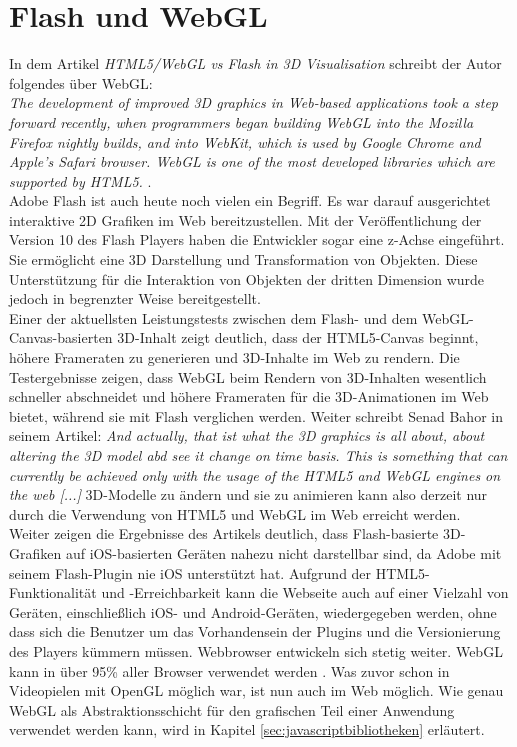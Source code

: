 \section{Flash und WebGL}
\label{sec:webgl2}
%
In dem Artikel \emph{HTML5/WebGL vs Flash in 3D Visualisation} schreibt der Autor folgendes über WebGL:\\

\textit{\glqq The development of improved 3D graphics in Web-based applications took a step forward recently, when programmers began building WebGL into the Mozilla Firefox nightly builds, and into WebKit, which is used by Google Chrome and Apple's Safari browser. WebGL is one of the most developed libraries which are supported by HTML5.\grqq } \cite{bahor_html5/webgl_2013}.\\

Adobe Flash ist auch heute noch vielen ein Begriff. Es war darauf ausgerichtet interaktive 2D Grafiken im Web bereitzustellen. Mit der Veröffentlichung der Version 10 des Flash Players haben die Entwickler sogar eine z-Achse eingeführt. Sie ermöglicht eine 3D Darstellung und Transformation von Objekten. Diese Unterstützung für die Interaktion von Objekten der dritten Dimension wurde jedoch in begrenzter Weise bereitgestellt.\\
Einer der aktuellsten Leistungstests zwischen dem Flash- und dem WebGL-Canvas-basierten 3D-Inhalt zeigt deutlich, dass der HTML5-Canvas beginnt, höhere Frameraten zu generieren und 3D-Inhalte im Web zu rendern. Die Testergebnisse zeigen, dass WebGL beim Rendern von 3D-Inhalten wesentlich schneller abschneidet und höhere Frameraten für die 3D-Animationen im Web bietet, während sie mit Flash verglichen werden. Weiter schreibt Senad Bahor in seinem Artikel: \textit{\glqq And actually, that ist what the 3D graphics is all about, about altering the 3D model abd see it change on time basis. This is something that can currently be achieved only with the usage of the HTML5 and WebGL engines on the web [...] \grqq} \cite{bahor_html5/webgl_2013} 3D-Modelle zu ändern und sie zu animieren kann also derzeit nur durch die Verwendung von HTML5 und WebGL im Web erreicht werden.\\
Weiter zeigen die Ergebnisse des Artikels deutlich, dass Flash-basierte 3D-Grafiken auf iOS-basierten Geräten nahezu nicht darstellbar sind, da Adobe mit seinem Flash-Plugin nie iOS unterstützt hat. Aufgrund der HTML5-Funktionalität und -Erreichbarkeit kann die Webseite auch auf einer Vielzahl von Geräten, einschließlich iOS- und Android-Geräten, wiedergegeben werden, ohne dass sich die Benutzer um das Vorhandensein der Plugins und die Versionierung des Players kümmern müssen.
Webbrowser entwickeln sich stetig weiter. WebGL kann in über 95\% aller Browser verwendet werden \cite{deveria_alexis_can_2013}. Was zuvor schon in Videopielen mit OpenGL möglich war, ist nun auch im Web möglich. Wie genau WebGL als Abstraktionsschicht für den grafischen Teil einer Anwendung verwendet werden kann, wird in Kapitel \ref{sec:javascriptbibliotheken} erläutert.

